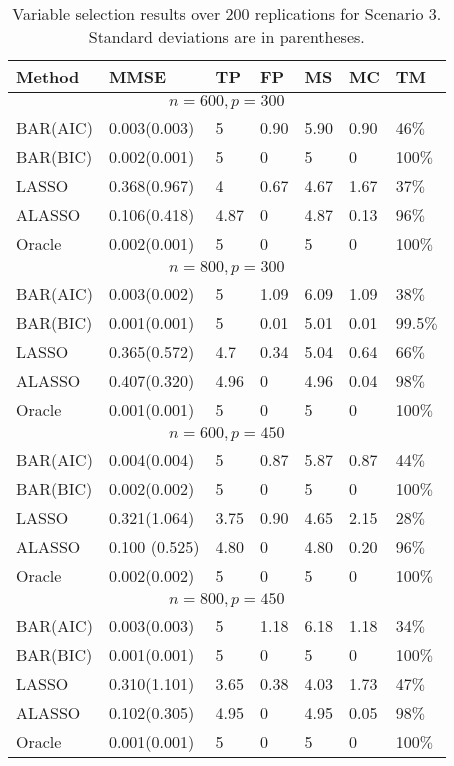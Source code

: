 \documentclass[11pt]{article}
\begin{document}
\begin{table}
\centering
\caption{Variable selection results over 200 replications for Scenario 3. Standard deviations are in parentheses.} \label{Sce3}
\begin{tabular}{l|llllll}
\hline
 Method & MMSE & TP & FP & MS & MC & TM \\
\hline
\multicolumn{7}{c}{$n=600,p=300$} \\
\hline
BAR(AIC) & 0.003(0.003) & 5 & 0.90 & 5.90 & 0.90 & 46$\%$ \\
BAR(BIC) & 0.002(0.001) & 5 & 0 & 5 & 0 & 100$\%$ \\
LASSO & 0.368(0.967) & 4 & 0.67 & 4.67 & 1.67 & 37$\%$  \\
ALASSO & 0.106(0.418) & 4.87 & 0 & 4.87 & 0.13 & 96$\%$  \\
Oracle & 0.002(0.001) & 5 & 0 & 5 & 0 & 100$\%$ \\
\hline
\multicolumn{7}{c}{$n=800,p=300$} \\
\hline
BAR(AIC) & 0.003(0.002) & 5 & 1.09 & 6.09 & 1.09 & 38$\%$ \\
BAR(BIC) & 0.001(0.001) & 5 & 0.01 & 5.01 & 0.01 & 99.5$\%$ \\
LASSO & 0.365(0.572) & 4.7 & 0.34 & 5.04 & 0.64 & 66$\%$  \\
ALASSO & 0.407(0.320) & 4.96 & 0 & 4.96 & 0.04 & 98$\%$  \\
Oracle & 0.001(0.001) & 5 & 0 & 5 & 0 & 100$\%$ \\
\hline
\multicolumn{7}{c}{$n=600,p=450$} \\
\hline
BAR(AIC) & 0.004(0.004) & 5 & 0.87 & 5.87 & 0.87 & 44$\%$  \\
BAR(BIC) & 0.002(0.002) & 5 & 0 & 5 & 0 & 100$\%$ \\
LASSO & 0.321(1.064) & 3.75 & 0.90 & 4.65 & 2.15 & 28$\%$  \\
ALASSO & 0.100 (0.525) & 4.80 & 0 & 4.80 & 0.20 & 96$\%$  \\
Oracle & 0.002(0.002) & 5 & 0 & 5 & 0 & 100$\%$ \\
\hline
\multicolumn{7}{c}{$n=800,p=450$} \\
\hline
BAR(AIC) & 0.003(0.003) & 5 & 1.18 & 6.18 & 1.18 & 34$\%$  \\
BAR(BIC) & 0.001(0.001) & 5 & 0 & 5 & 0 & 100$\%$ \\
LASSO & 0.310(1.101) & 3.65 & 0.38 & 4.03 & 1.73 & 47$\%$  \\
ALASSO & 0.102(0.305) & 4.95 & 0 & 4.95 & 0.05 & 98$\%$  \\ 
Oracle & 0.001(0.001) & 5 & 0 & 5 & 0 & 100$\%$ \\
\hline
\end{tabular}
\end{table}
\end{document}
